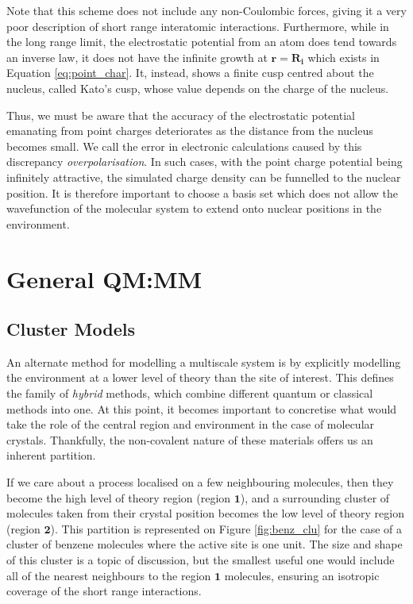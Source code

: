 Note that this scheme does not include any non-Coulombic forces, giving it a very poor description of short range interatomic interactions. Furthermore, while in the long range limit, the electrostatic potential from an atom does tend towards an inverse law, it does not have the infinite growth at $\bm{r} = \bm{R_i}$ which exists in Equation \ref{eq:point_char}. It, instead, shows a finite cusp centred about the nucleus, called Kato's cusp, whose value depends on the charge of the nucleus.\cite{Kato1957,March1986}

Thus, we must be aware that the accuracy of the electrostatic potential emanating from point charges deteriorates as the distance from the nucleus becomes small. We call the error in electronic calculations caused by this discrepancy \textit{overpolarisation}.\cite{Biancardi2016} In such cases, with the point charge potential being infinitely attractive, the simulated charge density can be funnelled to the nuclear position. It is therefore important to choose a basis set which does not allow the wavefunction of the molecular system to extend onto nuclear positions in the environment.

\section{General QM:MM}
\subsection{Cluster Models}

An alternate method for modelling a multiscale system is by explicitly modelling the environment at a lower level of theory than the site of interest. This defines the family of \textit{hybrid} methods, which combine different quantum or classical methods into one.
At this point, it becomes important to concretise what would take the role of the central region and environment in the case of molecular crystals. Thankfully, the non-covalent nature of these materials offers us an inherent partition.

If we care about a process localised on a few neighbouring molecules, then they become the high level of theory region (region $\bm{1}$), and a surrounding cluster of molecules taken from their crystal position becomes the low level of theory region (region $\bm{2}$). This partition is represented on Figure \ref{fig:benz_clu} for the case of a cluster of benzene molecules where the active site is one unit. The size and shape of this cluster is a topic of discussion, but the smallest useful one would include all of the nearest neighbours to the region $\bm{1}$ molecules, ensuring an isotropic coverage of the short range interactions.

